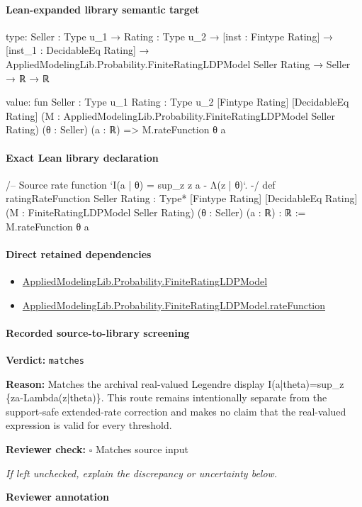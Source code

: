 \documentclass[10pt]{article}
\newcommand{\reviewerbox}{%
  \par\noindent\fbox{\parbox{0.96\linewidth}{\rule{0pt}{0.38in}}}\par
}
\newcommand{\reviewmatch}[1]{%
  \par\noindent\textbf{Reviewer check:} $\square$\; #1\par
  \noindent\emph{If left unchecked, explain the discrepancy or uncertainty below.}\par
}
\begin{document}
\paragraph{Lean-expanded library semantic target}
\begin{ReviewVerbatim}
type:
{Seller : Type u_1} →
  {Rating : Type u_2} →
    [inst : Fintype Rating] →
      [inst_1 : DecidableEq Rating] → AppliedModelingLib.Probability.FiniteRatingLDPModel Seller Rating → Seller → ℝ → ℝ

value:
fun {Seller : Type u_1} {Rating : Type u_2} [Fintype Rating] [DecidableEq Rating]
    (M : AppliedModelingLib.Probability.FiniteRatingLDPModel Seller Rating) (θ : Seller) (a : ℝ) =>
  M.rateFunction θ a
\end{ReviewVerbatim}

\paragraph{Exact Lean library declaration}
\begin{ReviewVerbatim}
/-- Source rate function `I(a | θ) = sup_z {z a - Λ(z | θ)}`. -/
def ratingRateFunction {Seller Rating : Type*} [Fintype Rating]
    [DecidableEq Rating]
    (M : FiniteRatingLDPModel Seller Rating) (θ : Seller) (a : ℝ) : ℝ :=
  M.rateFunction θ a
\end{ReviewVerbatim}

\paragraph{Direct retained dependencies}
\begin{itemize}\raggedright
\item \hyperlink{governing-declaration-765e92a42a7a9947}{Applied\allowbreak{}Modeling\allowbreak{}Lib.\allowbreak{}Probability.\allowbreak{}Finite\allowbreak{}Rating\allowbreak{}LDP\allowbreak{}Model}
\item \hyperlink{governing-declaration-83c1495637429813}{Applied\allowbreak{}Modeling\allowbreak{}Lib.\allowbreak{}Probability.\allowbreak{}Finite\allowbreak{}Rating\allowbreak{}LDP\allowbreak{}Model.\allowbreak{}rate\allowbreak{}Function}
\end{itemize}
\paragraph{Recorded source-to-library screening}
\textbf{Verdict:} \texttt{matches}
\\
{\raggedright
\textbf{Reason:} Matches the archival real-\allowbreak{}valued Legendre display I(a|theta)=sup\_\allowbreak{}z \{za-\allowbreak{}Lambda(z|theta)\}.\allowbreak{} This route remains intentionally separate from the support-\allowbreak{}safe extended-\allowbreak{}rate correction and makes no claim that the real-\allowbreak{}valued expression is valid for every threshold.\allowbreak{}
\par}
\reviewmatch{Matches source input}
\noindent\textbf{Reviewer annotation}\par
\reviewerbox
\clearpage
\hypertarget{library-prerequisite-f4469065f0a02cc9}{}
\end{document}
